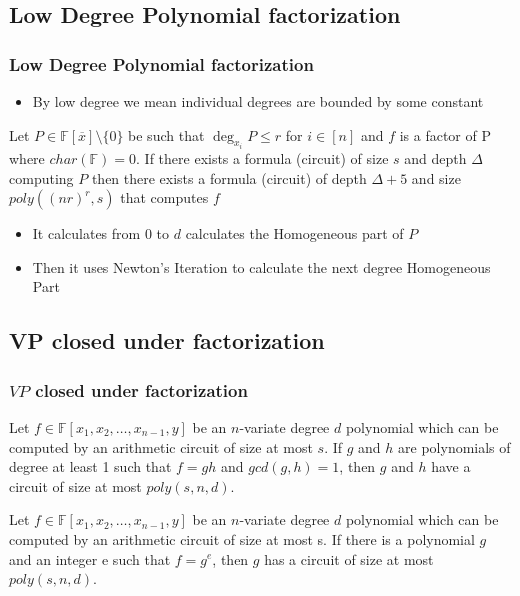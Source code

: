 \documentclass[10pt]{beamer}
\begin{document}
\subsection{Low Degree Polynomial factorization}
\begin{frame}
	\frametitle{Low Degree Polynomial factorization}
	
\begin{itemize}
    \item By low degree we mean individual degrees are bounded by some constant
\end{itemize}

\vspace{5mm}
 
\begin{theorem}
    Let $P\in\mathbb{F}[\overline{x}]\setminus\{0\}$ be such that $ \deg_{x_i}P\leq r$ for $i\in[n]$ and $f $ is a factor of P where $char(\mathbb{F})=0$. If there exists a formula (circuit) of size $s$ and depth $\Delta$ computing $P$ then there exists a formula (circuit) of depth $\Delta+5$ and size $poly((nr)^r,s)$ that computes $f$
\end{theorem}
\vspace{5mm}

\begin{itemize}
    \item It calculates from $0$ to $d$ calculates the Homogeneous part of $P$ 
    \item Then it uses Newton's Iteration to calculate the next degree Homogeneous Part
\end{itemize}
\end{frame}

\subsection{VP closed under factorization}
\begin{frame}
	\frametitle{$VP$ closed under factorization}
	\begin{theorem}
	Let $f\in\mathbb{F}[x_1, x_2,\dots, x_{n-1}, y]$ be an $n$-variate degree $d$ polynomial which can be computed by an arithmetic circuit of size at most $s$. If $g$ and $h$ are polynomials of degree at least 1 such
	that $f = g  h$ and $gcd(g, h) = 1$, then $g$ and $h$ have a circuit of size at most $poly(s, n, d)$.
	\end{theorem}
	
	\begin{theorem}
Let $f \in \mathbb{F}\left[x_1, x_2, \ldots, x_{n-1}, y\right]$ be an $n$-variate degree $d$ polynomial which can be computed by an arithmetic circuit of size at most s. If there is a polynomial $g$ and an integer e such that $f=g^e$, then $g$ has a circuit of size at most ${poly}(s, n, d)$.
	\end{theorem}
	
	
\end{frame}
\end{document}
